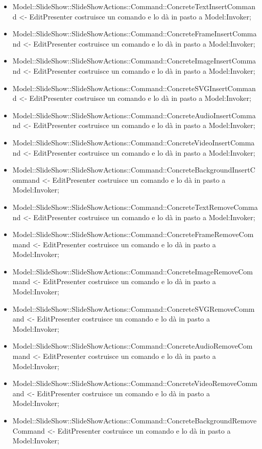 {{\begin{itemize}
			\item Model::SlideShow::SlideShowActions::Command::ConcreteTextInsertCommand <- EditPresenter costruisce un comando e lo dà in pasto a Model:Invoker;
			\item Model::SlideShow::SlideShowActions::Command::ConcreteFrameInsertCommand <- EditPresenter costruisce un comando e lo dà in pasto a Model:Invoker;
			\item Model::SlideShow::SlideShowActions::Command::ConcreteImageInsertCommand <- EditPresenter costruisce un comando e lo dà in pasto a Model:Invoker;
			\item Model::SlideShow::SlideShowActions::Command::ConcreteSVGInsertCommand <- EditPresenter costruisce un comando e lo dà in pasto a Model:Invoker;
			\item Model::SlideShow::SlideShowActions::Command::ConcreteAudioInsertCommand <- EditPresenter costruisce un comando e lo dà in pasto a Model:Invoker;
			\item Model::SlideShow::SlideShowActions::Command::ConcreteVideoInsertCommand <- EditPresenter costruisce un comando e lo dà in pasto a Model:Invoker;
			\item Model::SlideShow::SlideShowActions::Command::ConcreteBackgroundInsertCommand <- EditPresenter costruisce un comando e lo dà in pasto a Model:Invoker;
			\item Model::SlideShow::SlideShowActions::Command::ConcreteTextRemoveCommand <- EditPresenter costruisce un comando e lo dà in pasto a Model:Invoker;
			\item Model::SlideShow::SlideShowActions::Command::ConcreteFrameRemoveCommand <- EditPresenter costruisce un comando e lo dà in pasto a Model:Invoker;
			\item Model::SlideShow::SlideShowActions::Command::ConcreteImageRemoveCommand <- EditPresenter costruisce un comando e lo dà in pasto a Model:Invoker;
			\item Model::SlideShow::SlideShowActions::Command::ConcreteSVGRemoveCommand <- EditPresenter costruisce un comando e lo dà in pasto a Model:Invoker;
			\item Model::SlideShow::SlideShowActions::Command::ConcreteAudioRemoveCommand <- EditPresenter costruisce un comando e lo dà in pasto a Model:Invoker;
			\item Model::SlideShow::SlideShowActions::Command::ConcreteVideoRemoveCommand <- EditPresenter costruisce un comando e lo dà in pasto a Model:Invoker;
			\item Model::SlideShow::SlideShowActions::Command::ConcreteBackgroundRemoveCommand <- EditPresenter costruisce un comando e lo dà in pasto a Model:Invoker;

\end{itemize}}}
